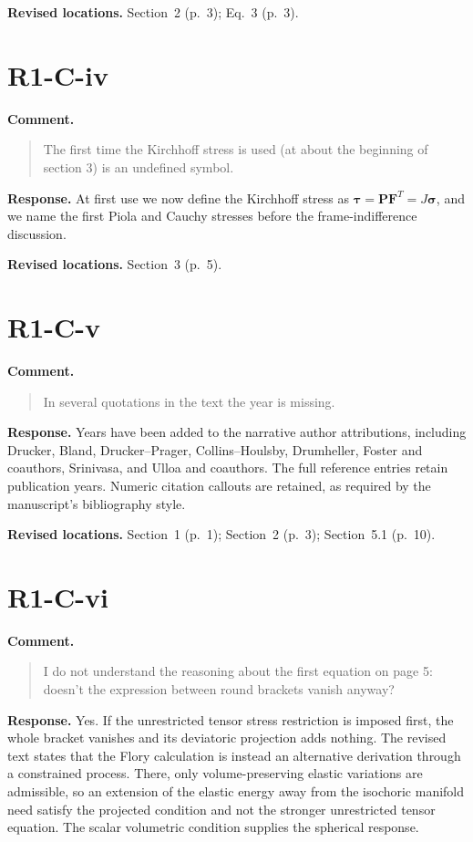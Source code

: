 \documentclass[11pt]{article}
\begin{document}
\textbf{Revised locations.} Section~2 (p.~3); Eq.~3 (p.~3).
\section{R1-C-iv}
\textbf{Comment.}\begin{quote}\small
The first time the Kirchhoff stress is used (at about the beginning of section 3) is an undefined symbol.
\end{quote}
\textbf{Response.} At first use we now define the Kirchhoff stress as
\(\boldsymbol\tau=\mathbf P\mathbf F^T=J\boldsymbol\sigma\), and we name the
first Piola and Cauchy stresses before the frame-indifference discussion.

\textbf{Revised locations.} Section~3 (p.~5).
\section{R1-C-v}
\textbf{Comment.}\begin{quote}\small
In several quotations in the text the year is missing.
\end{quote}
\textbf{Response.} Years have been added to the narrative author attributions,
including Drucker, Bland, Drucker--Prager, Collins--Houlsby, Drumheller,
Foster and coauthors, Srinivasa, and Ulloa and coauthors. The full reference
entries retain publication years. Numeric citation callouts are retained, as
required by the manuscript's bibliography style.

\textbf{Revised locations.} Section~1 (p.~1); Section~2 (p.~3); Section~5.1 (p.~10).
\section{R1-C-vi}
\textbf{Comment.}\begin{quote}\small
I do not understand the reasoning about the first equation on page 5: doesn't the expression between round brackets vanish anyway?
\end{quote}
\textbf{Response.} Yes. If the unrestricted tensor stress restriction is
imposed first, the whole bracket vanishes and its deviatoric projection adds
nothing. The revised text states that the Flory calculation is instead an
alternative derivation through a constrained process. There, only
volume-preserving elastic variations are admissible, so an extension of the
elastic energy away from the isochoric manifold need satisfy the projected
condition and not the stronger unrestricted tensor equation. The scalar
volumetric condition supplies the spherical response.
\end{document}
